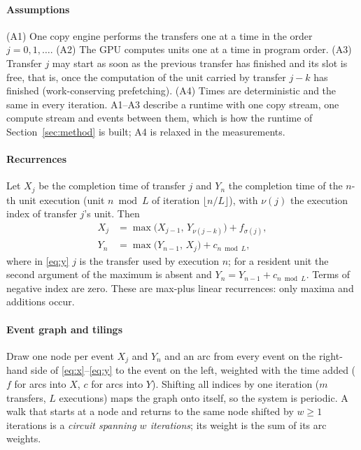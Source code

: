 \documentclass[final,5p,times,twocolumn]{elsarticle}
\theoremstyle{definition}
\begin{document}
\paragraph{Assumptions}
(A1) One copy engine performs the transfers one at a time in the order $j=0,1,\dots$. (A2) The GPU computes units one at a time in program order. (A3) Transfer $j$ may start as soon as the previous transfer has finished and its slot is free, that is, once the computation of the unit carried by transfer $j-k$ has finished (work-conserving prefetching). (A4) Times are deterministic and the same in every iteration. A1--A3 describe a runtime with one copy stream, one compute stream and events between them, which is how the runtime of Section~\ref{sec:method} is built; A4 is relaxed in the measurements.

\paragraph{Recurrences}
Let $X_j$ be the completion time of transfer $j$ and $Y_n$ the completion time of the $n$-th unit execution (unit $n \bmod L$ of iteration $\lfloor n/L\rfloor$), with $\nu(j)$ the execution index of transfer $j$'s unit. Then
\begin{align}
X_j &= \max\bigl(X_{j-1},\, Y_{\nu(j-k)}\bigr) + f_{\sigma(j)}, \label{eq:x}\\
Y_n &= \max\bigl(Y_{n-1},\, X_{j}\bigr) + c_{n \bmod L}, \label{eq:y}
\end{align}
where in \eqref{eq:y} $j$ is the transfer used by execution $n$; for a resident unit the second argument of the maximum is absent and $Y_n=Y_{n-1}+c_{n\bmod L}$. Terms of negative index are zero. These are max-plus linear recurrences: only maxima and additions occur.

\paragraph{Event graph and tilings}
Draw one node per event $X_j$ and $Y_n$ and an arc from every event on the right-hand side of \eqref{eq:x}--\eqref{eq:y} to the event on the left, weighted with the time added ($f$ for arcs into $X$, $c$ for arcs into $Y$). Shifting all indices by one iteration ($m$ transfers, $L$ executions) maps the graph onto itself, so the system is periodic. A walk that starts at a node and returns to the same node shifted by $w\ge1$ iterations is a \emph{circuit spanning $w$ iterations}; its weight is the sum of its arc weights.
\end{document}
